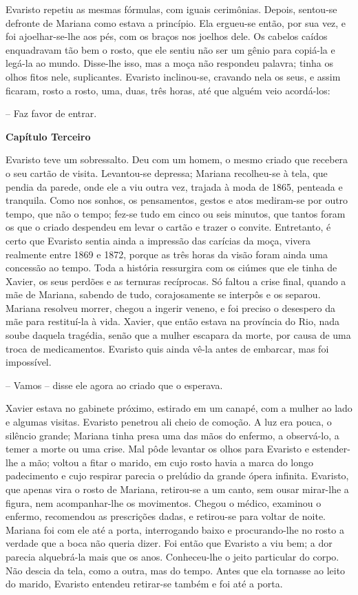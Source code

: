Evaristo repetiu as mesmas fórmulas, com iguais cerimônias. Depois,
sentou-se defronte de Mariana como estava a princípio. Ela ergueu-se
então, por sua vez, e foi ajoelhar-se-lhe aos pés, com os braços nos
joelhos dele. Os cabelos caídos enquadravam tão bem o rosto, que ele
sentiu não ser um gênio para copiá-la e legá-la ao mundo. Disse-lhe
isso, mas a moça não respondeu palavra; tinha os olhos fitos nele,
suplicantes. Evaristo inclinou-se, cravando nela os seus, e assim
ficaram, rosto a rosto, uma, duas, três horas, até que alguém veio
acordá-los:

-- Faz favor de entrar.

\textbf{Capítulo Terceiro}

Evaristo teve um sobressalto. Deu com um homem, o mesmo criado que
recebera o seu cartão de visita. Levantou-se depressa; Mariana
recolheu-se à tela, que pendia da parede, onde ele a viu outra vez,
trajada à moda de 1865, penteada e tranquila. Como nos sonhos, os
pensamentos, gestos e atos mediram-se por outro tempo, que não o tempo;
fez-se tudo em cinco ou seis minutos, que tantos foram os que o criado
despendeu em levar o cartão e trazer o convite. Entretanto, é certo que
Evaristo sentia ainda a impressão das carícias da moça, vivera realmente
entre 1869 e 1872, porque as três horas da visão foram ainda uma
concessão ao tempo. Toda a história ressurgira com os ciúmes que ele
tinha de Xavier, os seus perdões e as ternuras recíprocas. Só faltou a
crise final, quando a mãe de Mariana, sabendo de tudo, corajosamente se
interpôs e os separou. Mariana resolveu morrer, chegou a ingerir veneno,
e foi preciso o desespero da mãe para restituí-la à vida. Xavier, que
então estava na província do Rio, nada soube daquela tragédia, senão que
a mulher escapara da morte, por causa de uma troca de medicamentos.
Evaristo quis ainda vê-la antes de embarcar, mas foi impossível.

-- Vamos -- disse ele agora ao criado que o esperava.

Xavier estava no gabinete próximo, estirado em um canapé, com a mulher
ao lado e algumas visitas. Evaristo penetrou ali cheio de comoção. A luz
era pouca, o silêncio grande; Mariana tinha presa uma das mãos do
enfermo, a observá-lo, a temer a morte ou uma crise. Mal pôde levantar
os olhos para Evaristo e estender-lhe a mão; voltou a fitar o marido, em
cujo rosto havia a marca do longo padecimento e cujo respirar parecia o
prelúdio da grande ópera infinita. Evaristo, que apenas vira o rosto de
Mariana, retirou-se a um canto, sem ousar mirar-lhe a figura, nem
acompanhar-lhe os movimentos. Chegou o médico, examinou o enfermo,
recomendou as prescrições dadas, e retirou-se para voltar de noite.
Mariana foi com ele até a porta, interrogando baixo e procurando-lhe no
rosto a verdade que a boca não queria dizer. Foi então que Evaristo a
viu bem; a dor parecia alquebrá-la mais que os anos. Conheceu-lhe o
jeito particular do corpo. Não descia da tela, como a outra, mas do
tempo. Antes que ela tornasse ao leito do marido, Evaristo entendeu
retirar-se também e foi até a porta.

